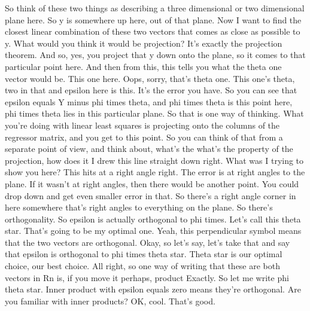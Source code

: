 \documentclass[11pt,a4paper]{article}
\begin{document}
So think of these two things as describing a three dimensional or two dimensional plane here. So y is somewhere up here, out of that plane. Now I want to find the closest linear combination of these two vectors that comes as close as possible to y. What would you think it would be projection? It's exactly the projection theorem. And so, yes, you project that y down onto the plane, so it comes to that particular point here. And then from this, this tells you what the theta one vector would be. This one here. Oops, sorry, that's theta one. This one's theta, two in that and epsilon here is this. It's the error you have. So you can see that epsilon equals Y minus phi times theta, and phi times theta is this point here, phi times theta lies in this particular plane. So that is one way of thinking. What you're doing with linear least squares is projecting onto the columns of the regressor matrix, and you get to this point. So you can think of that from a separate point of view, and think about, what's the what's the property of the projection, how does it I drew this line straight down right. What was I trying to show you here? This hits at a right angle right. The error is at right angles to the plane. If it wasn't at right angles, then there would be another point. You could drop down and get even smaller error in that. So there's a right angle corner in here somewhere that's right angles to everything on the plane. So there's orthogonality. So epsilon is actually orthogonal to phi times. Let's call this theta star. That's going to be my optimal one. Yeah, this perpendicular symbol means that the two vectors are orthogonal. Okay, so let's say, let's take that and say that epsilon is orthogonal to phi times theta star. Theta star is our optimal choice, our best choice. All right, so one way of writing that these are both vectors in Rn is, if you move it perhaps, product Exactly. So let me write phi theta star. Inner product with epsilon equals zero means they're orthogonal. Are you familiar with inner products? OK, cool. That's good.
\end{document}
